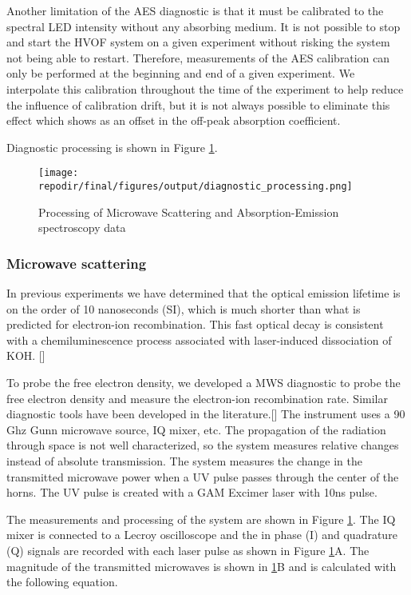 Another limitation of the AES diagnostic is that it must be calibrated to the spectral LED intensity without any absorbing medium. It is not possible to stop and start the HVOF system on a given experiment without risking the system not being able to restart. Therefore, measurements of the AES calibration can only be performed at the beginning and end of a given experiment. We interpolate this calibration throughout the time of the experiment to help reduce the influence of calibration drift, but it is not always possible to eliminate this effect which shows as an offset in the off-peak absorption coefficient.




Diagnostic processing is shown in Figure \ref{fig:diagnostic_processing}.

\begin{figure}[h]
    \texttt{[image: \\repodir/final/figures/output/diagnostic\_processing.png]} 
    \caption{Processing of Microwave Scattering and Absorption-Emission spectroscopy data}
    \label{fig:diagnostic_processing}
\end{figure}


\subsubsection{Microwave scattering}

 In previous experiments we have determined that the optical emission lifetime is on the order of 10 nanoseconds (SI), which is much shorter than what is predicted for electron-ion recombination. This fast optical decay is consistent with a chemiluminescence process associated with laser-induced dissociation of KOH. [] 

To probe the free electron density, we developed a MWS diagnostic to probe the free electron density and measure the electron-ion recombination rate. Similar diagnostic tools have been developed in the literature.[] The instrument uses a 90 Ghz Gunn microwave source, IQ mixer, etc. The propagation of the radiation through space is not well characterized, so the system measures relative changes instead of absolute transmission. The system measures the change in the transmitted microwave power when a UV pulse passes through the center of the horns. The UV pulse is created with a GAM Excimer laser with 10ns pulse. 

The measurements and processing of the system are shown in Figure \ref{fig:diagnostic_processing}. The IQ mixer is connected to a Lecroy oscilloscope and the in phase (I) and quadrature (Q) signals are recorded with each laser pulse as shown in Figure \ref{fig:diagnostic_processing}A. The magnitude of the transmitted microwaves is shown in \ref{fig:diagnostic_processing}B and is calculated with the following equation.

